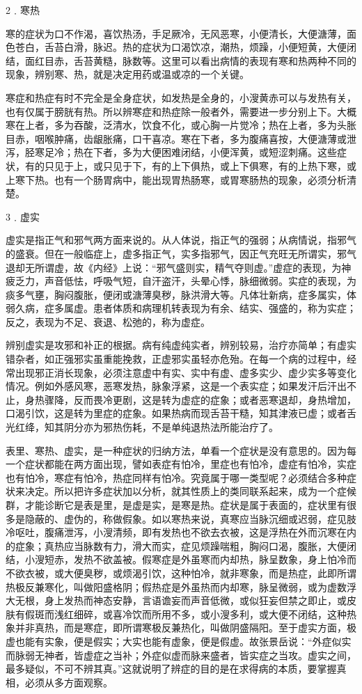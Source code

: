 \documentclass[12pt,UTF8]{ctexbook}
\begin{document}
2﹒寒热

寒的症状为口不作渴，喜饮热汤，手足厥冷，无风恶寒，小便清长，大便溏薄，面色苍白，舌苔白滑，脉迟。热的症状为口渴饮凉，潮热，烦躁，小便短黄，大便闭结，面红目赤，舌苔黄糙，脉数等。这里可以看出病情的表现有寒和热两种不同的现象，辨别寒、热，就是决定用药或温或凉的一个关键。

寒症和热症有时不完全是全身症状，如发热是全身的，小溲黄赤可以与发热有关，也有仅属于膀胱有热。所以辨寒症和热症除一般者外，需要进一步分别上下。大概寒在上者，多为吞酸，泛清水，饮食不化，或心胸一片觉冷；热在上者，多为头胀目赤，咽喉肿痛，齿龈胀痛，口干喜凉。寒在下者，多为腹痛喜按，大便溏薄或泄泻，胫寒足冷；热在下者，多为大便困难闭结，小便浑黄，或短涩刺痛。这些症状，有的只见于上，或只见于下，有的上下俱热，或上下俱寒，有的上热下寒，或上寒下热。也有一个肠胃病中，能出现胃热肠寒，或胃寒肠热的现象，必须分析清楚。

3﹒虚实

虚实是指正气和邪气两方面来说的。从人体说，指正气的强弱；从病情说，指邪气的盛衰。但在一般临症上，虚多指正气，实多指邪气，因正气充旺无所谓实，邪气退却无所谓虚，故《内经》上说：“邪气盛则实，精气夺则虚。”虚症的表现，为神疲乏力，声音低怯，呼吸气短，自汗盗汗，头晕心悸，脉细微弱。实症的表现，为痰多气壅，胸闷腹胀，便闭或溏薄臭秽，脉洪滑大等。凡体壮新病，症多属实，体弱久病，症多属虚。患者体质和病理机转表现为有余、结实、强盛的，称为实症；反之，表现为不足、衰退、松弛的，称为虚症。

辨别虚实是攻邪和补正的根据。病有纯虚纯实者，辨别较易，治疗亦简单；有虚实错杂者，如正强邪实虽重能挽救，正虚邪实虽轻亦危殆。在每一个病的过程中，经常出现邪正消长现象，必须注意虚中有实、实中有虚、虚多实少、虚少实多等变化情况。例如外感风寒，恶寒发热，脉象浮紧，这是一个表实症；如果发汗后汗出不止，身热骤降，反而畏冷更剧，这是转为虚症的症象；或者恶寒退却，身热增加，口渴引饮，这是转为里症的症象。如果热病而现舌苔干糙，知其津液已虚；或者舌光红绛，知其阴分亦为邪热伤耗，不是单纯退热法所能治疗了。

表里、寒热、虚实，是一种症状的归纳方法，单看一个症状是没有意思的。因为每一个症状都能在两方面出现，譬如表症有怕冷，里症也有怕冷，虚症有怕冷，实症也有怕冷，寒症有怕冷，热症同样有怕冷。究竟属于哪一类型呢？必须结合多种症状来决定。所以把许多症状加以分析，就其性质上的类同联系起来，成为一个症候群，才能诊断它是表是里，是虚是实，是寒是热。症状是属于表面的，症状里有很多是隐蔽的、虚伪的，称做假象。如以寒热来说，真寒应当脉沉细或迟弱，症见肢冷呕吐，腹痛泄泻，小溲清频，即有发热也不欲去衣被，这是浮热在外而沉寒在内的症象；真热应当脉数有力，滑大而实，症见烦躁喘粗，胸闷口渴，腹胀，大便闭结，小溲短赤，发热不欲盖被。假寒症是外虽寒而内却热，脉呈数象，身上怕冷而不欲衣被，或大便臭秽，或烦渴引饮，这种怕冷，就非寒象，而是热症，此即所谓热极反兼寒化，叫做阳盛格阴；假热症是外虽热而内却寒，脉呈微弱，或为虚数浮大无根，身上发热而神态安静，言语谵妄而声音低微，或似狂妄但禁之即止，或皮肤有假斑而浅红细碎，或喜冷饮而所用不多，或小溲多利，或大便不闭结，这种热象并非真热，而是寒症，即所谓寒极反兼热化，叫做阴盛隔阳。至于虚实方面，极虚也能有实象，便是假实；大实也能有虚象，便是假虚。故张景岳说：“外症似实而脉弱无神者，皆虚症之当补；外症似虚而脉来盛者，皆实症之当攻。虚实之间，最多疑似，不可不辨其真。”这就说明了辨症的目的是在求得病的本质，要掌握真相，必须从多方面观察。
\end{document}
